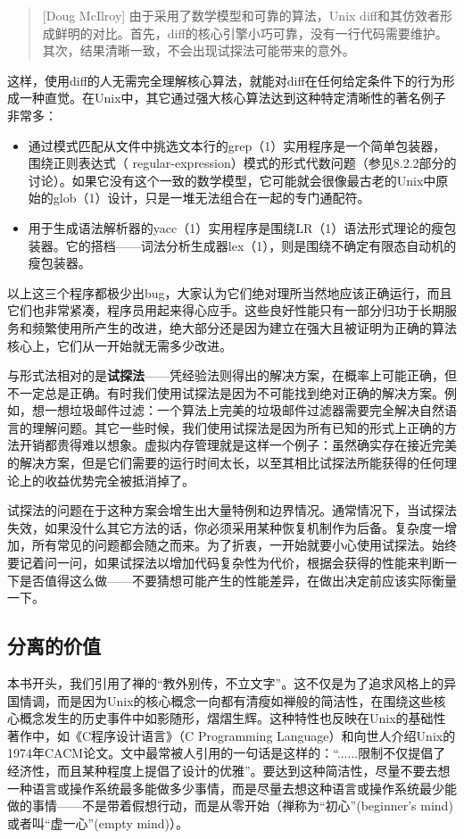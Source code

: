 \documentclass[12pt,oneside]{book}
\begin{document}
\begin{common-format}
\begin{quote}[Doug McIlroy]
由于采用了数学模型和可靠的算法，Unix diff和其仿效者形成鲜明的对比。首先，diff的核心引擎小巧可靠，没有一行代码需要维护。其次，结果清晰一致，不会出现试探法可能带来的意外。
\end{quote}

这样，使用diff的人无需完全理解核心算法，就能对diff在任何给定条件下的行为形成一种直觉。在Unix中，其它通过强大核心算法达到这种特定清晰性的著名例子非常多：

\begin{itemize}
\item 通过模式匹配从文件中挑选文本行的grep（1）实用程序是一个简单包装器，围绕正则表达式（ regular-expression）模式的形式代数问题（参见8.2.2部分的讨论）。如果它没有这个一致的数学模型，它可能就会很像最古老的Unix中原始的glob（1）设计，只是一堆无法组合在一起的专门通配符。
\item 用于生成语法解析器的yacc（1）实用程序是围绕LR（1）语法形式理论的瘦包装器。它的搭档——词法分析生成器lex（1），则是围绕不确定有限态自动机的瘦包装器。
\end{itemize}

以上这三个程序都极少出bug，大家认为它们绝对理所当然地应该正确运行，而且它们也非常紧凑，程序员用起来得心应手。这些良好性能只有一部分归功于长期服务和频繁使用所产生的改进，绝大部分还是因为建立在强大且被证明为正确的算法核心上，它们从一开始就无需多少改进。

与形式法相对的是\textbf{试探法}——凭经验法则得出的解决方案，在概率上可能正确，但不一定总是正确。有时我们使用试探法是因为不可能找到绝对正确的解决方案。例如，想一想垃圾邮件过滤：一个算法上完美的垃圾邮件过滤器需要完全解决自然语言的理解问题。其它一些时候，我们使用试探法是因为所有已知的形式上正确的方法开销都贵得难以想象。虚拟内存管理就是这样一个例子：虽然确实存在接近完美的解决方案，但是它们需要的运行时间太长，以至其相比试探法所能获得的任何理论上的收益优势完全被抵消掉了。

试探法的问题在于这种方案会增生出大量特例和边界情况。通常情况下，当试探法失效，如果没什么其它方法的话，你必须采用某种恢复机制作为后备。复杂度一增加，所有常见的问题都会随之而来。为了折衷，一开始就要小心使用试探法。始终要记着问一问，如果试探法以增加代码复杂性为代价，根据会获得的性能来判断一下是否值得这么做——不要猜想可能产生的性能差异，在做出决定前应该实际衡量一下。

\subsection{分离的价值}
本书开头，我们引用了禅的“教外别传，不立文字”。这不仅是为了追求风格上的异国情调，而是因为Unix的核心概念一向都有清瘦如禅般的简洁性，在围绕这些核心概念发生的历史事件中如影随形，熠熠生辉。这种特性也反映在Unix的基础性著作中，如《C程序设计语言》（C Programming Language）\cite{Kernighan-Ritchie}和向世人介绍Unix的1974年CACM论文。文中最常被人引用的一句话是这样的：“......限制不仅提倡了经济性，而且某种程度上提倡了设计的优雅”。要达到这种简洁性，尽量不要去想一种语言或操作系统最多能做多少事情，而是尽量去想这种语言或操作系统最少能做的事情——不是带着假想行动，而是从零开始（禅称为“初心”(beginner's mind)或者叫“虚一心”(empty mind)）。


\end{common-format}
\end{document}
